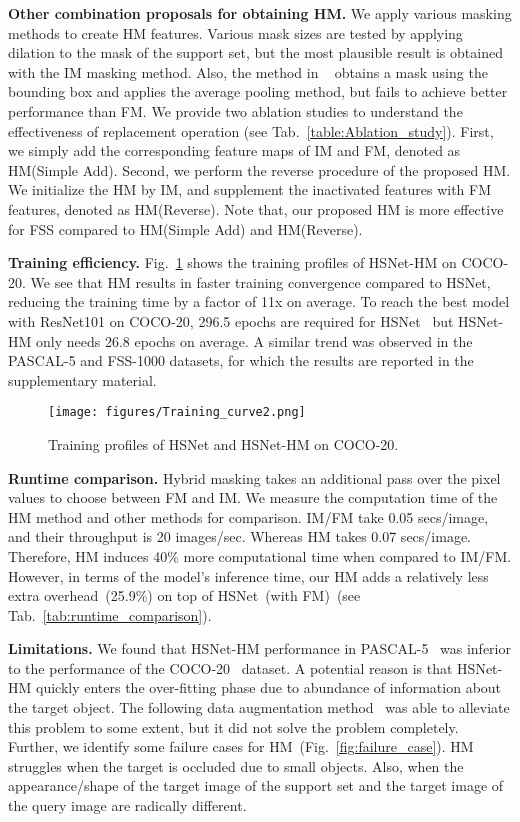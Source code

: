 \documentclass[runningheads]{llncs}
\begin{document}
\noindent\textbf{Other combination proposals for obtaining HM.} 
We apply various masking methods to create HM features. Various mask sizes are tested by applying dilation to the mask of the support set, but the most plausible result is obtained with the IM masking method. Also, the method in ~\cite{Zhang2020SGOneSG} obtains a mask using the bounding box and applies the average pooling method, but fails to achieve better performance than FM. 
We provide two ablation studies to understand the effectiveness of replacement operation (see Tab.~\ref{table:Ablation_study}).
First, we simply add the corresponding feature maps of IM and FM, denoted as HM(Simple Add). Second, we perform the reverse procedure of the proposed HM. We initialize the HM by IM, and supplement the inactivated features with FM features, denoted as HM(Reverse). Note that, our proposed HM is more effective for FSS compared to HM(Simple Add) and HM(Reverse).




\noindent\textbf{Training efficiency.}
Fig.~\ref{fig:Training_curve} shows the training profiles of HSNet-HM on COCO-20. 
We see that HM results in faster training convergence compared to HSNet, reducing the training time by a factor of 11x on average. To reach the best model with ResNet101 on COCO-20, 296.5 epochs are required for HSNet~\cite{HSNet} but HSNet-HM only needs 26.8 epochs on average.
A similar trend was observed in the PASCAL-5 and FSS-1000 datasets, for which the results are reported in the supplementary material.

\begin{figure}[!htp]
\centering
\texttt{[image: figures/Training\_curve2.png]}
\caption{ Training profiles of HSNet\cite{HSNet} and HSNet-HM on COCO-20.}
\label{fig:Training_curve}
\end{figure}


\noindent\textbf{Runtime comparison.}
Hybrid masking takes an additional pass over the pixel values to choose between FM and IM. We measure the computation time of the HM method and other methods for comparison. IM/FM take 0.05 secs/image, and their throughput is 20 images/sec. Whereas HM takes 0.07 secs/image. Therefore, HM induces 40\% more computational time when compared to IM/FM. However, in terms of the model's inference time, our HM adds a relatively less extra overhead~(25.9\%) on top of HSNet~(with FM)~(see Tab.~\ref{tab:runtime_comparison}).



\noindent \textbf{Limitations.}
We found that HSNet-HM performance in PASCAL-5~\cite{pascal} was inferior to the performance of the COCO-20~\cite{lin2015microsoft} dataset. A potential reason is that HSNet-HM quickly enters the over-fitting phase due to abundance of information about the target object. The following data augmentation method~\cite{data_aug_1,data_gug_2,VAT} was able to alleviate this problem to some extent, but it did not solve the problem completely. Further, we identify some failure cases for HM~(Fig.~\ref{fig:failure_case}). HM struggles when the target is occluded due to small objects. Also, when the appearance/shape of the target image of the support set and the target image of the query image are radically different.
\end{document}

